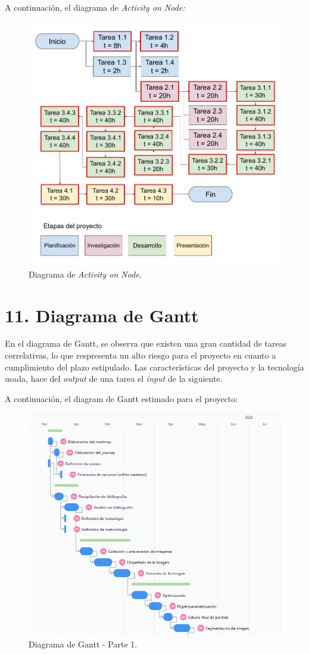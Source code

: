 \documentclass[
11pt, %
]{charter}
\begin{document}
\begin{•}
A continuación, el diagrama de \textit{Activity on Node:}

\begin{figure}[htpb]
\centering 
\includegraphics[width=.8\textwidth]{./Figuras/AoN.jpg}
\caption{Diagrama de \textit{Activity on Node}.}
\label{fig:AoN}
\end{figure}




\section{11. Diagrama de Gantt}
\label{sec:gantt}

En el diagrama de Gantt, se observa que existen una gran cantidad de tareas correlativas, lo que respresenta un alto riesgo para el proyecto en cuanto a cumplimiento del plazo estipulado. Las características del proyecto y la tecnología usada, hace del \textit{output} de una tarea el \textit{input} de la siguiente.

A continuación, el diagram de Gantt estimado para el proyecto:

\begin{figure}[htpb]
\centering 
\includegraphics[width=.9\textwidth]{./Figuras/Gantt_1.jpg}
\caption{Diagrama de Gantt - Parte 1.}
\label{fig:Gantt_1}
\end{figure}


\end{•}
\end{document}
